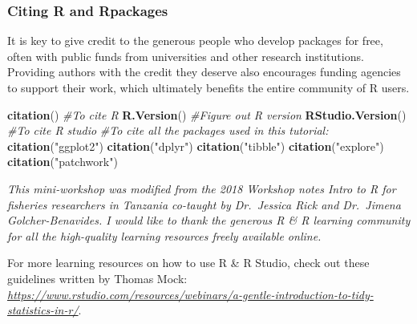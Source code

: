 \documentclass[]{article}
\newenvironment{Shaded}{\begin{snugshade}}{\end{snugshade}}
\newcommand{\CommentTok}[1]{\textcolor[rgb]{0.56,0.35,0.01}{\textit{#1}}}
\newcommand{\KeywordTok}[1]{\textcolor[rgb]{0.13,0.29,0.53}{\textbf{#1}}}
\newcommand{\NormalTok}[1]{#1}
\newcommand{\StringTok}[1]{\textcolor[rgb]{0.31,0.60,0.02}{#1}}
\begin{document}
\hypertarget{citing-r-and-rpackages}{%
\subsubsection{Citing R and Rpackages}\label{citing-r-and-rpackages}}

It is key to give credit to the generous people who develop packages for
free, often with public funds from universities and other research
institutions. Providing authors with the credit they deserve also
encourages funding agencies to support their work, which ultimately
benefits the entire community of R users.

\begin{Shaded}
\begin{Highlighting}[]
\KeywordTok{citation}\NormalTok{() }\CommentTok{#To cite R}
\KeywordTok{R.Version}\NormalTok{() }\CommentTok{#Figure out R version}
\KeywordTok{RStudio.Version}\NormalTok{() }\CommentTok{#To cite R studio}
\CommentTok{#To cite all the packages  used in this tutorial:}
\KeywordTok{citation}\NormalTok{(}\StringTok{"ggplot2"}\NormalTok{)}
\KeywordTok{citation}\NormalTok{(}\StringTok{"dplyr"}\NormalTok{)}
\KeywordTok{citation}\NormalTok{(}\StringTok{"tibble"}\NormalTok{)}
\KeywordTok{citation}\NormalTok{(}\StringTok{"explore"}\NormalTok{)}
\KeywordTok{citation}\NormalTok{(}\StringTok{"patchwork"}\NormalTok{)}
\end{Highlighting}
\end{Shaded}

\emph{This mini-workshop was modified from the 2018 Workshop notes Intro
to R for fisheries researchers in Tanzania co-taught by Dr.~Jessica Rick
and Dr.~Jimena Golcher-Benavides. I would like to thank the generous R
\& R learning community for all the high-quality learning resources
freely available online.}

For more learning resources on how to use R \& R Studio, check out these
guidelines written by Thomas Mock:
\emph{\url{https://www.rstudio.com/resources/webinars/a-gentle-introduction-to-tidy-statistics-in-r/}}.
\end{document}
